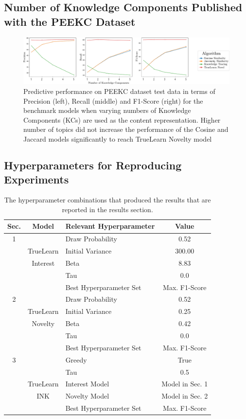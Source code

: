 \documentclass[letterpaper]{article} %
\begin{document}
\subsection{Number of Knowledge Components Published with the PEEKC Dataset}

\begin{figure}[h]
\begin{center}
    \centerline{\includegraphics[width=1.1\linewidth]{results_plot.pdf}}
    \caption{Predictive performance on PEEKC dataset test data in terms of Precision (left), Recall (middle) and F1-Score (right) for the benchmark models when varying numbers of Knowledge Components (KCs) are used as the content representation. Higher number of topics did not increase the performance of the Cosine and Jaccard models significantly to reach TrueLearn Novelty model}
\end{center}
\end{figure}

\subsection{Hyperparameters for Reproducing Experiments}

\begin{table}[h] \footnotesize
\caption{The hyperparameter combinations that produced the results that are reported in the results section.}
\centering
\begin{tabular}{c c l c}
  \hline
    Sec. &  Model & Relevant Hyperparameter & Value \\
  \hline
  1 & & Draw Probability & 0.52\\
  & TrueLearn& Initial Variance & 300.00 \\
  & Interest& Beta & 8.83 \\
  & & Tau & 0.0\\
  & & Best Hyperparameter Set & Max. F1-Score \\
  \hline
 2 & & Draw Probability & 0.52\\
  & TrueLearn& Initial Variance & 0.25 \\
  & Novelty& Beta & 0.42 \\
  & & Tau & 0.0\\
  & & Best Hyperparameter Set & Max. F1-Score \\
  \hline
  3 & & Greedy & True\\
  & & Tau & 0.5\\
  & TrueLearn & Interest Model & Model in Sec. 1 \\
  & INK & Novelty Model & Model in Sec. 2 \\
  & & Best Hyperparameter Set & Max. F1-Score \\
   \hline
\end{tabular}
\end{table}
\end{document}
